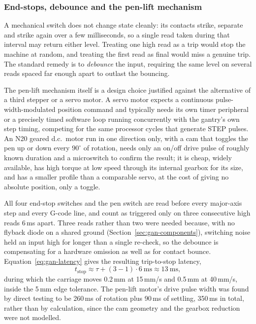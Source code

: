 \subsubsection{End-stops, debounce and the pen-lift mechanism}
\label{sec:gan-stop}
\label{sec:gan-pen}

A mechanical switch does not change state cleanly: its contacts strike, separate and strike again over a few milliseconds, so a single read taken during that interval may return either level. Treating one high read as a trip would stop the machine at random, and treating the first read as final would miss a genuine trip. The standard remedy is to \emph{debounce} the input, requiring the same level on several reads spaced far enough apart to outlast the bouncing.

The pen-lift mechanism itself is a design choice justified against the alternative of a third stepper or a servo motor. A servo motor expects a continuous pulse-width-modulated position command and typically needs its own timer peripheral or a precisely timed software loop running concurrently with the gantry's own step timing, competing for the same processor cycles that generate STEP pulses. An N20 geared d.c.\ motor run in one direction only, with a cam that toggles the pen up or down every $90^\circ$ of rotation, needs only an on/off drive pulse of roughly known duration and a microswitch to confirm the result; it is cheap, widely available, has high torque at low speed through its internal gearbox for its size, and has a smaller profile than a comparable servo, at the cost of giving no absolute position, only a toggle.

All four end-stop switches and the pen switch are read before every major-axis step and every G-code line, and count as triggered only on three consecutive high reads 6\,ms apart. Three reads rather than two were needed because, with no flyback diode on a shared ground (Section~\ref{sec:gan-components}), switching noise held an input high for longer than a single re-check, so the debounce is compensating for a hardware omission as well as for contact bounce. Equation~\ref{eq:gan-latency} gives the resulting trip-to-stop latency,
\begin{equation}
t_{\mathrm{stop}}\approx\tau+(3-1)\cdot6\ \mathrm{ms}\approx13\ \mathrm{ms},
\label{eq:gan-latency}
\end{equation}
during which the carriage moves 0.2\,mm at 15\,mm/s and 0.5\,mm at 40\,mm/s, inside the 5\,mm edge tolerance. The pen-lift motor's drive pulse width was found by direct testing to be 260\,ms of rotation plus 90\,ms of settling, 350\,ms in total, rather than by calculation, since the cam geometry and the gearbox reduction were not modelled.


